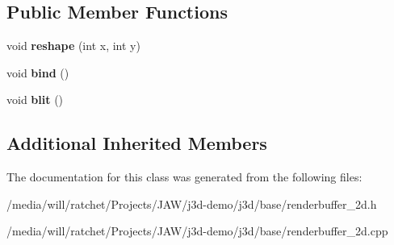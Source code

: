 \subsection*{Public Member Functions}
\begin{DoxyCompactItemize}
\item 
\hypertarget{classj3d_1_1base_1_1Renderbuffer2D_a00f70f33dd8433635a765f5c10e2c234}{}void {\bfseries reshape} (int x, int y)\label{classj3d_1_1base_1_1Renderbuffer2D_a00f70f33dd8433635a765f5c10e2c234}

\item 
\hypertarget{classj3d_1_1base_1_1Renderbuffer2D_a24cf4da6d9f6e69d0f514732d78e8fb4}{}void {\bfseries bind} ()\label{classj3d_1_1base_1_1Renderbuffer2D_a24cf4da6d9f6e69d0f514732d78e8fb4}

\item 
\hypertarget{classj3d_1_1base_1_1Renderbuffer2D_af8e98b3af5b027fa51dd9a31d5219cea}{}void {\bfseries blit} ()\label{classj3d_1_1base_1_1Renderbuffer2D_af8e98b3af5b027fa51dd9a31d5219cea}

\end{DoxyCompactItemize}
\subsection*{Additional Inherited Members}


The documentation for this class was generated from the following files\+:\begin{DoxyCompactItemize}
\item 
/media/will/ratchet/\+Projects/\+J\+A\+W/j3d-\/demo/j3d/base/renderbuffer\+\_\+2d.\+h\item 
/media/will/ratchet/\+Projects/\+J\+A\+W/j3d-\/demo/j3d/base/renderbuffer\+\_\+2d.\+cpp\end{DoxyCompactItemize}
